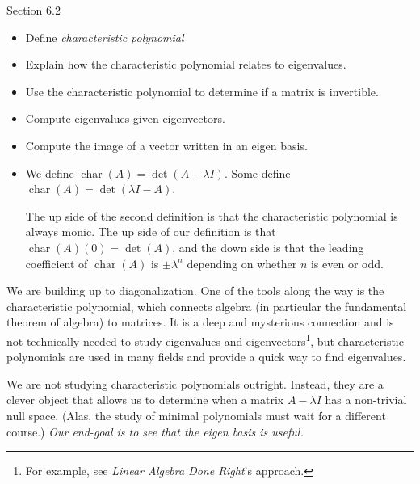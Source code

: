 \documentclass{problemset}
\DeclareMathOperator{\Char}{char}
\begin{document}
\begin{lesson}

	Section 6.2

	\begin{itemize}
		\item Define \emph{characteristic polynomial}
		\item Explain how the characteristic polynomial relates to eigenvalues.
		\item Use the characteristic polynomial to determine if a matrix is invertible.
		\item Compute eigenvalues given eigenvectors.
		\item Compute the image of a vector written in an eigen basis.
	\end{itemize}

	\begin{annotation}
		\begin{notes}
			\begin{itemize}
				\item We define $\Char(A)=\det(A-\lambda I)$.
					Some define $\Char(A)=\det(\lambda I-A)$.

					The up side of the second definition is
					that the characteristic polynomial is always monic.
					The up side of our definition is that
					$\Char(A)(0)=\det(A)$, and the down side is that
					the leading coefficient of $\Char(A)$ is $\pm\lambda^n$ depending
					on whether $n$ is even or odd.
			\end{itemize}
		\end{notes}
	\end{annotation}
	We are building up to diagonalization. One of the tools along the way is the characteristic polynomial,
	which connects algebra (in particular the fundamental theorem of algebra) to matrices. It is a deep
	and mysterious connection and is not technically needed to study eigenvalues and eigenvectors\footnote{
		For example, see \emph{Linear Algebra Done Right}'s approach.}, but characteristic polynomials
	are used in many fields and provide a quick way to find eigenvalues.

	We are not studying characteristic polynomials outright. Instead, they are a clever object
	that allows us to determine when a matrix $A-\lambda I$ has a non-trivial null space. (Alas, the
	study of minimal polynomials must wait for a different course.)
	\emph{Our end-goal is to see that the eigen basis is useful.}

\end{lesson}
\end{document}
